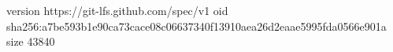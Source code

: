 version https://git-lfs.github.com/spec/v1
oid sha256:a7be593b1e90ca73cace08c06637340f13910aea26d2eaae5995fda0566e901a
size 43840
